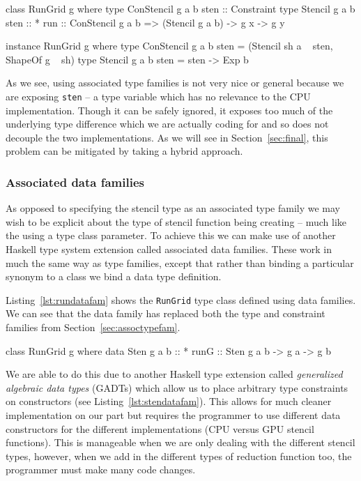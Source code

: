 \documentclass[12pt,a4paper,twoside]{scrbook}
\begin{document}
\begin{hflisting}[label={lst:constkind}, caption={The application of type
    families to the run primitive.}]
class RunGrid g where
    type ConStencil g a b sten :: Constraint
    type Stencil g a b sten :: *
    run :: ConStencil g a b => (Stencil g a b) -> g x -> g y

instance RunGrid g where
    type ConStencil g a b sten = (Stencil sh a ~ sten, ShapeOf g ~ sh)
    type Stencil g a b sten = sten -> Exp b
\end{hflisting}

As we see, using associated type families is not very nice or general because we
are exposing \texttt{sten} -- a type variable which has no relevance to the CPU
implementation. Though it can be safely ignored, it exposes too much of the
underlying type difference which we are actually coding for and so does not
decouple the two implementations. As we will see in Section~\ref{sec:final},
this problem can be mitigated by taking a hybrid approach.

\subsubsection{Associated data families}
\label{sec:assoc-data-fam}

As opposed to specifying the stencil type as an associated type family we may
wish to be explicit about the type of stencil function being creating -- much
like the using a type class parameter. To achieve this we can make use of
another Haskell type system extension called associated data families. These
work in much the same way as type families, except that rather than binding a
particular synonym to a class we bind a data type definition.

Listing~\ref{lst:rundatafam} shows the \texttt{RunGrid} type class defined using
data families. We can see that the data family has replaced both the type and
constraint families from Section~\ref{sec:assoctypefam}.

\begin{hflisting}[label=lst:rundatafam,
caption=RunGrid with associated data family.]
class RunGrid g where
    data Sten g a b :: *
    runG :: Sten g a b -> g a -> g b
\end{hflisting}

We are able to do this due to another Haskell type extension called
\emph{generalized algebraic data types} (GADTs) which allow us to place
arbitrary type constraints on constructors (see Listing~\ref{lst:stendatafam}).
This allows for much cleaner implementation on our part but requires the
programmer to use different data constructors for the different implementations
(CPU versus GPU stencil functions). This is manageable when we are only dealing
with the different stencil types, however, when we add in the different types of
reduction function too, the programmer must make many code changes.
\end{document}
